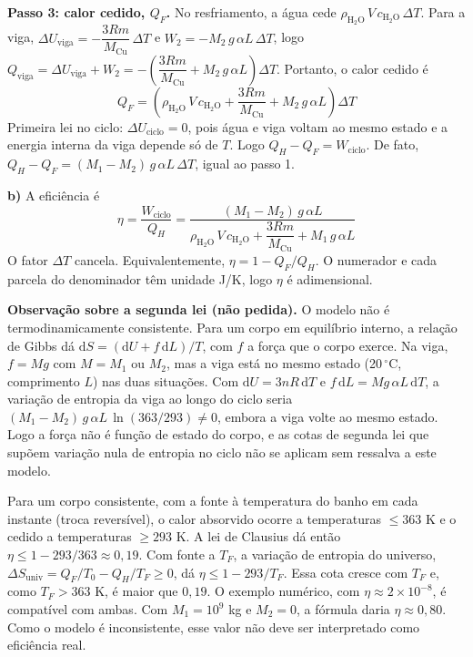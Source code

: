 \documentclass{article}%
\begin{document}
\textbf{Passo 3: calor cedido, $Q_F$.} No resfriamento, a água cede $\rho_{\text{H}_2\text{O}}\,V\,c_{\text{H}_2\text{O}}\,\Delta T$. Para a viga, $\Delta U_{\text{viga}}=-\dfrac{3Rm}{M_{\text{Cu}}}\,\Delta T$ e $W_2=-M_2\,g\,\alpha L\,\Delta T$, logo $Q_{\text{viga}}=\Delta U_{\text{viga}}+W_2=-\left(\dfrac{3Rm}{M_{\text{Cu}}}+M_2\,g\,\alpha L\right)\Delta T$. Portanto, o calor cedido é
\[ Q_F=\left(\rho_{\text{H}_2\text{O}}\,V\,c_{\text{H}_2\text{O}}+\frac{3Rm}{M_{\text{Cu}}}+M_2\,g\,\alpha L\right)\Delta T \]
Primeira lei no ciclo: $\Delta U_{\text{ciclo}}=0$, pois água e viga voltam ao mesmo estado e a energia interna da viga depende só de $T$. Logo $Q_H-Q_F=W_{\text{ciclo}}$. De fato, $Q_H-Q_F=(M_1-M_2)\,g\,\alpha L\,\Delta T$, igual ao passo 1.

\textbf{b)} A eficiência é
\[ \eta=\frac{W_{\text{ciclo}}}{Q_H}=\frac{(M_1-M_2)\,g\,\alpha L}{\rho_{\text{H}_2\text{O}}\,V\,c_{\text{H}_2\text{O}}+\dfrac{3Rm}{M_{\text{Cu}}}+M_1\,g\,\alpha L} \]
O fator $\Delta T$ cancela. Equivalentemente, $\eta=1-Q_F/Q_H$. O numerador e cada parcela do denominador têm unidade J/K, logo $\eta$ é adimensional.

\textbf{Observação sobre a segunda lei (não pedida).} O modelo não é termodinamicamente consistente. Para um corpo em equilíbrio interno, a relação de Gibbs dá $\mathrm{d}S=(\mathrm{d}U+f\,\mathrm{d}L)/T$, com $f$ a força que o corpo exerce. Na viga, $f=Mg$ com $M=M_1$ ou $M_2$, mas a viga está no mesmo estado (20\,$^\circ$C, comprimento $L$) nas duas situações. Com $\mathrm{d}U=3nR\,\mathrm{d}T$ e $f\,\mathrm{d}L=Mg\,\alpha L\,\mathrm{d}T$, a variação de entropia da viga ao longo do ciclo seria $(M_1-M_2)\,g\,\alpha L\,\ln(363/293)\neq 0$, embora a viga volte ao mesmo estado. Logo a força não é função de estado do corpo, e as cotas de segunda lei que supõem variação nula de entropia no ciclo não se aplicam sem ressalva a este modelo.

Para um corpo consistente, com a fonte à temperatura do banho em cada instante (troca reversível), o calor absorvido ocorre a temperaturas $\le 363$ K e o cedido a temperaturas $\ge 293$ K. A lei de Clausius dá então $\eta\le 1-293/363\approx 0{,}19$. Com fonte a $T_F$, a variação de entropia do universo, $\Delta S_{\text{univ}}=Q_F/T_0-Q_H/T_F\ge 0$, dá $\eta\le 1-293/T_F$. Essa cota cresce com $T_F$ e, como $T_F>363$ K, é maior que $0{,}19$. O exemplo numérico, com $\eta\approx 2\times 10^{-8}$, é compatível com ambas. Com $M_1=10^{9}$ kg e $M_2=0$, a fórmula daria $\eta\approx 0{,}80$. Como o modelo é inconsistente, esse valor não deve ser interpretado como eficiência real.
\end{document}
